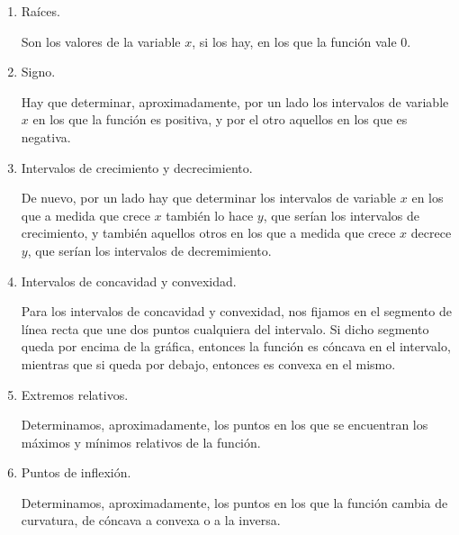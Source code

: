 \begin{enumerate}[leftmargin=*]
\begin{enumerate}
\item  Raíces.



\begin{indicacion}
{Son los valores de la variable $x$, si los hay, en los que la
función vale 0.}

\end{indicacion}

\item  Signo.

\begin{indicacion}
{Hay que determinar, aproximadamente, por un lado los intervalos
de variable $x$ en los que la función es positiva, y por el otro
aquellos en los que es negativa. }
\end{indicacion}

\item  Intervalos de crecimiento y decrecimiento.

\begin{indicacion}
{De nuevo, por un lado hay que determinar los intervalos de
variable $x$ en los que a medida que crece $x$ también lo hace
$y$, que serían los intervalos de crecimiento, y también aquellos
otros en los que a medida que crece $x$ decrece $y$, que serían
los intervalos de decremimiento. }
\end{indicacion}

\item Intervalos de concavidad y convexidad.

\begin{indicacion}
{Para los intervalos de concavidad y convexidad, nos fijamos en el
segmento de línea recta que une dos puntos cualquiera del
intervalo. Si dicho segmento queda por encima de la gráfica,
entonces la función es cóncava en el intervalo, mientras que si
queda por debajo, entonces es convexa en el mismo. }
\end{indicacion}

\item Extremos relativos.

\begin{indicacion}
{Determinamos, aproximadamente, los puntos en los que se
encuentran los máximos y mínimos relativos de la función. }
\end{indicacion}

\item Puntos de inflexión.

\begin{indicacion}
{Determinamos, aproximadamente, los puntos en los que la función
cambia de curvatura, de cóncava a convexa o a la inversa. }
\end{indicacion}


\end{enumerate}
\end{enumerate}
